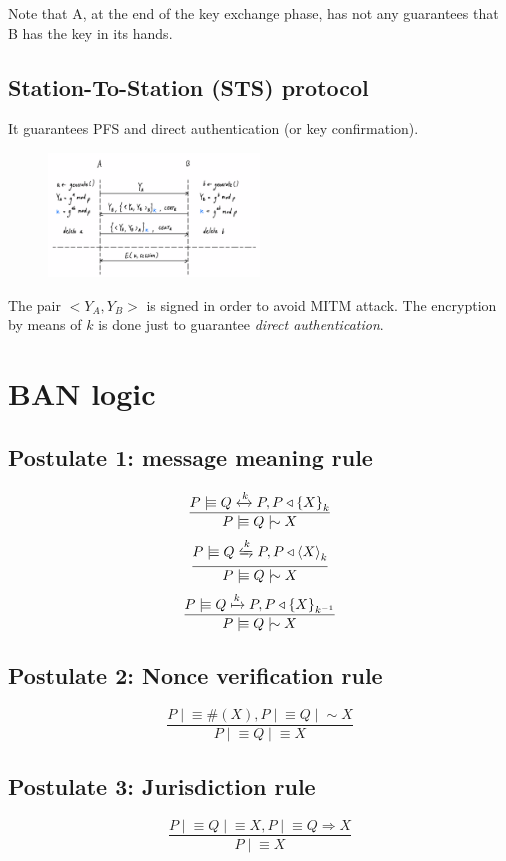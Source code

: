 \documentclass[a4paper,12pt]{article}
\newcommand{\believes}{\mid\!\equiv}
\newcommand{\sees}{\triangleleft}
\newcommand{\oncesaid}{\mid\!\sim}
\newcommand{\controls}{\Rightarrow}
\newcommand{\fresh}[1]{\#(#1)}
\newcommand{\combine}[2]{{\langle #1 \rangle}_{#2}}
\newcommand{\encrypt}[2]{{ \{ #1 \} }_{#2}}
\newcommand{\sharekey}[1]{\xleftrightarrow{#1}}
\newcommand{\pubkey}[1]{\xmapsto{#1}}
\newcommand{\secret}[1]{\xleftrightharpoons{#1}}
\begin{document}
Note that A, at the end of the key exchange phase, has not any guarantees that B has the key in its hands.

\subsection{Station-To-Station (STS) protocol}
It guarantees PFS and direct authentication (or key confirmation).

\begin{figure}[H]
  \centering
  \includegraphics[width=0.5\textwidth]{img/sts}
\end{figure}

The pair $<Y_A,Y_B>$ is signed in order to avoid MITM attack. The encryption by means of $k$ is done just to guarantee \textit{direct authentication}.

\section{BAN logic}
\subsection{Postulate 1: message meaning rule}

\[\frac{P \believes Q \sharekey{k} P, P \sees \encrypt{X}{k}}{P \believes Q \oncesaid X}\]
\[\frac{P \believes Q \secret{k} P, P \sees \combine{X}{k}}{P \believes Q \oncesaid X}\]
\[\frac{P \believes Q \pubkey{k} P, P \sees \encrypt{X}{k^{-1}}}{P \believes Q \oncesaid X}\]

\subsection{Postulate 2: Nonce verification rule}
\[\frac{P \believes \fresh{X}, P \believes Q \oncesaid X}{P \believes Q \believes X}\]

\subsection{Postulate 3: Jurisdiction rule}
\[\frac{P \believes Q \believes X, P \believes Q \controls X}{P \believes X}\]
\end{document}
